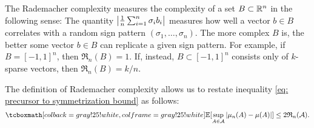 The Rademacher complexity measures the complexity of a set $B \subset \mathbb{R}^n$ in the following sense: The quantity $\abs{\frac{1}{n} \sum_{i=1}^n \sigma_i b_i}$ measures how well a vector $b \in B$ correlates with a random sign pattern $(\sigma_1, \dots, \sigma_n)$. The more complex $B$ is, the better some vector $b \in B$ can replicate a given sign pattern. For example, if $B = [-1, 1]^n$, then $\mathfrak{R}_n(B) = 1$. If, instead, $B \subset [-1, 1]^n$ consists only of $k$-sparse vectors, then $\mathfrak{R}_n(B) = k/n$.

The definition of Rademacher complexity allows us to restate inequality \eqref{eq: precursor to symmetrization bound} as follows:
\begin{equation}
\label{eq: symmetrization bound}
    \highlightMath{
        \Exp[\sup_{A \in \mathcal{A}} \abs{\mu_n(A) - \mu(A)}] \leq 2 \mathfrak{R}_n(\mathcal{A}).
    }
\end{equation}
